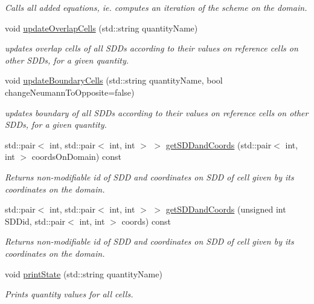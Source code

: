 \begin{DoxyCompactItemize}
\begin{DoxyCompactList}\small\item\em Calls all added equations, ie. computes an iteration of the scheme on the domain. \item\end{DoxyCompactList}\item 
void \hyperlink{classDomain_abcd8aa2529907b8022e41e45c85f5144}{updateOverlapCells} (std::string quantityName)
\begin{DoxyCompactList}\small\item\em updates overlap cells of all SDDs according to their values on reference cells on other SDDs, for a given quantity. \item\end{DoxyCompactList}\item 
void \hyperlink{classDomain_af169473470489edc4235399887c10da0}{updateBoundaryCells} (std::string quantityName, bool changeNeumannToOpposite=false)
\begin{DoxyCompactList}\small\item\em updates boundary of all SDDs according to their values on reference cells on other SDDs, for a given quantity. \item\end{DoxyCompactList}\item 
std::pair$<$ int, std::pair$<$ int, int $>$ $>$ \hyperlink{classDomain_accb471dd6649bd38403cd28a2bbccd79}{getSDDandCoords} (std::pair$<$ int, int $>$ coordsOnDomain) const 
\begin{DoxyCompactList}\small\item\em Returns non-\/modifiable id of SDD and coordinates on SDD of cell given by its coordinates on the domain. \item\end{DoxyCompactList}\item 
std::pair$<$ int, std::pair$<$ int, int $>$ $>$ \hyperlink{classDomain_afc46286fa167e7a2ebccacced8d31c34}{getSDDandCoords} (unsigned int SDDid, std::pair$<$ int, int $>$ coords) const 
\begin{DoxyCompactList}\small\item\em Returns non-\/modifiable id of SDD and coordinates on SDD of cell given by its coordinates on the domain. \item\end{DoxyCompactList}\item 
void \hyperlink{classDomain_a1163559d75540c4cd29c7aa775feca80}{printState} (std::string quantityName)
\begin{DoxyCompactList}\small\item\em Prints quantity values for all cells. \item\end{DoxyCompactList}\end{DoxyCompactItemize}



